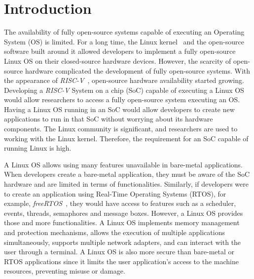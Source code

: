 
\section{Introduction}
\label{sec:intro}

The availability of fully open-source systems capable of executing an Operating System (OS) is limited. For a long time, the Linux kernel~\cite{torvalds1997linux} and the open-source software built around it allowed developers
to implement a fully open-source Linux OS on their closed-source hardware devices. However, the scarcity of open-source hardware complicated the development of fully open-source systems. With the appearance of \textit{RISC-V}~\cite{asanovic2014instruction}, open-source hardware availability started growing. Developing a \textit{RISC-V} System on a chip (SoC) capable of executing a Linux OS would allow researchers to access a fully open-source system executing an OS. Having a Linux OS running in an SoC would allow developers to create new applications to run in that SoC without worrying about its hardware components. The Linux community is significant, and researchers are used to working with the Linux kernel. Therefore, the requirement for an SoC capable of running Linux is high. 

A Linux OS allows using many features unavailable in bare-metal applications. When developers create a bare-metal application, they must be aware of the SoC hardware and are limited in terms of functionalities. Similarly, if developers were to create an application using Real-Time Operating Systems (RTOS), for example, \textit{freeRTOS}~\cite{barry2008freertos}, they would have access to features such as a scheduler, events, threads, semaphores and message boxes. However, a Linux OS provides those and more functionalities. A Linux OS implements memory management and protection mechanisms, allows the execution of multiple applications simultaneously, supports multiple network adapters, and can interact with the user through a terminal. A Linux OS is also more secure than bare-metal or RTOS applications since it limits the user application's access to the machine resources, preventing misuse or damage.

